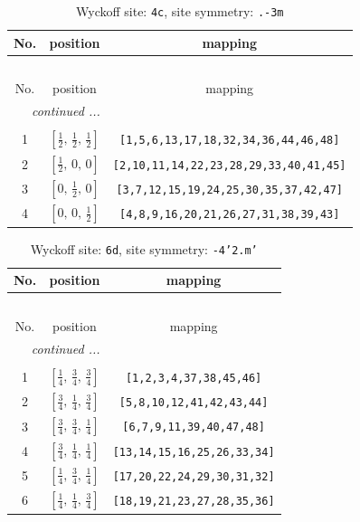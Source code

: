 \documentclass[fleqn,8pt]{jsarticle}
\begin{document}
\renewcommand{\arraystretch}{1.2}
\begin{longtable}{ccc}
\caption{Wyckoff site: {\tt 4c}, site symmetry: {\tt .-3m}}
 \\
 \hline \hline
No. & position & mapping \\ \hline \endfirsthead

\multicolumn{2}{l}{\tablename\ \thetable{}} \\
 \hline \hline
No. & position & mapping \\ \hline \endhead

 \hline \hline
\multicolumn{2}{r}{\footnotesize\it continued ...} \\ \endfoot

 \hline \hline
\multicolumn{2}{r}{} \\ \endlastfoot

1 & $\left[ \frac{1}{2},\, \frac{1}{2},\, \frac{1}{2} \right]$ & {\tt [1,5,6,13,17,18,32,34,36,44,46,48]} \\ \hline
2 & $\left[ \frac{1}{2},\, 0,\, 0 \right]$ & {\tt [2,10,11,14,22,23,28,29,33,40,41,45]} \\ \hline
3 & $\left[ 0,\, \frac{1}{2},\, 0 \right]$ & {\tt [3,7,12,15,19,24,25,30,35,37,42,47]} \\ \hline
4 & $\left[ 0,\, 0,\, \frac{1}{2} \right]$ & {\tt [4,8,9,16,20,21,26,27,31,38,39,43]} \\
\end{longtable}
\renewcommand{\arraystretch}{1.2}
\begin{longtable}{ccc}
\caption{Wyckoff site: {\tt 6d}, site symmetry: {\tt -4'2.m'}}
 \\
 \hline \hline
No. & position & mapping \\ \hline \endfirsthead

\multicolumn{2}{l}{\tablename\ \thetable{}} \\
 \hline \hline
No. & position & mapping \\ \hline \endhead

 \hline \hline
\multicolumn{2}{r}{\footnotesize\it continued ...} \\ \endfoot

 \hline \hline
\multicolumn{2}{r}{} \\ \endlastfoot

1 & $\left[ \frac{1}{4},\, \frac{3}{4},\, \frac{3}{4} \right]$ & {\tt [1,2,3,4,37,38,45,46]} \\ \hline
2 & $\left[ \frac{3}{4},\, \frac{1}{4},\, \frac{3}{4} \right]$ & {\tt [5,8,10,12,41,42,43,44]} \\ \hline
3 & $\left[ \frac{3}{4},\, \frac{3}{4},\, \frac{1}{4} \right]$ & {\tt [6,7,9,11,39,40,47,48]} \\ \hline
4 & $\left[ \frac{3}{4},\, \frac{1}{4},\, \frac{1}{4} \right]$ & {\tt [13,14,15,16,25,26,33,34]} \\ \hline
5 & $\left[ \frac{1}{4},\, \frac{3}{4},\, \frac{1}{4} \right]$ & {\tt [17,20,22,24,29,30,31,32]} \\ \hline
6 & $\left[ \frac{1}{4},\, \frac{1}{4},\, \frac{3}{4} \right]$ & {\tt [18,19,21,23,27,28,35,36]} \\
\end{longtable}
\end{document}
